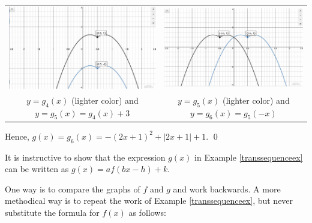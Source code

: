 \begin{ex}
\begin{enumerate}
\begin{center}
\begin{tabular}{cc}

\includegraphics[width=3in]{./TransformationsGraphics/TransformationsEx04e.jpg} & \includegraphics[width=3in]{./TransformationsGraphics/TransformationsEx04f.jpg} \\

$y=g_{4}(x)$ (lighter color) and $y=g_{5}(x) = g_{4}(x)+3$ &  $y = g_{5}(x)$ (lighter color) and $y = g_{6}(x) = g_{5}(-x)$ \\

\end{tabular}

\end{center} 

\end{enumerate}

Hence, $g(x) = g_{6}(x) = -(2x+1)^2+|2x+1| + 1$.  \qed
 
\end{ex}

It is instructive to show that the expression $g(x)$ in Example \ref{transsequenceex}  can be written as $g(x) = a f(bx-h)+k$.  

\smallskip

One way is to compare the graphs of $f$ and $g$ and work backwards.  A more methodical way is to repeat the work of Example \ref{transsequenceex}, but never substitute the formula for $f(x)$ as follows:


